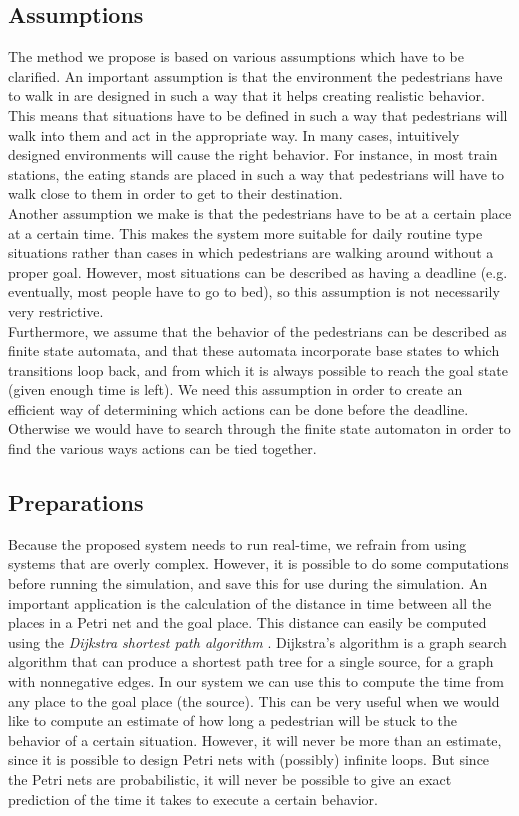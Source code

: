 \documentclass[11pt]{article}
\begin{document}
\subsection{Assumptions}
The method we propose is based on various assumptions which have to be clarified. An important assumption is that the environment the pedestrians have to walk in are designed in such a way that it helps creating realistic behavior. This means that situations have to be defined in such a way that pedestrians will walk into them and act in the appropriate way. In many cases, intuitively designed environments will cause the right behavior. For instance, in most train stations, the eating stands are placed in such a way that pedestrians will have to walk close to them in order to get to their destination.\\ 
Another assumption we make is that the pedestrians have to be at a certain place at a certain time. This makes the system more suitable for daily routine type situations rather than cases in which pedestrians are walking around without a proper goal. However, most situations can be described as having a deadline (e.g. eventually, most people have to go to bed), so this assumption is not necessarily very restrictive.\\
Furthermore, we assume that the behavior of the pedestrians can be described as finite state automata,  and that these automata incorporate base states to which transitions loop back, and from which it is always possible to reach the goal state (given enough time is left). We need this assumption in order to create an efficient way of determining which actions can be done before the deadline. Otherwise we would have to search through the finite state automaton in order to find the various ways actions can be tied together.\\

\subsection{Preparations}
Because the proposed system needs to run real-time, we refrain from using systems that are overly complex.
However, it is possible to do some computations before running the simulation, and save this for use during the simulation. An important application is the calculation of the distance in time between all the places in a Petri net and the goal place. This distance can easily be computed using the \emph{Dijkstra shortest path algorithm} \cite{dijkstra}. Dijkstra's algorithm is a graph search algorithm that can produce a shortest path tree for a single source, for a graph with nonnegative edges. In our system we can use this to compute the time from any place to the goal place (the source). This can be very useful when we would like to compute an estimate of how long a pedestrian will be stuck to the behavior of a certain situation. However, it will never be more than an estimate, since it is possible to design Petri nets with (possibly) infinite loops. But since the Petri nets are probabilistic, it will never be possible to give an exact prediction of the time it takes to execute a certain behavior.
\end{document}
